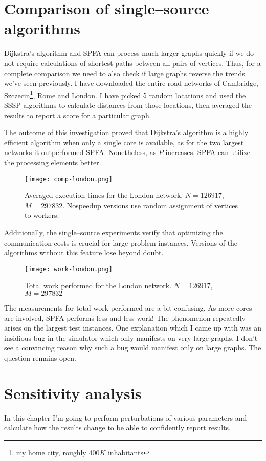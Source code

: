 \documentclass[12pt,a4paper,twoside,openright]{report}
\begin{document}
\section{Comparison of single--source algorithms}
Dijkstra's algorithm and SPFA can process much larger graphs quickly if we do not require calculations of shortest paths between all pairs of vertices. Thus, for a complete comparison we need to also check if large graphs reverse the trends we've seen previously. I have downloaded the entire road networks of Cambridge, Szczecin\footnote{my home city, roughly $400K$ inhabitants}, Rome and London. I have picked $5$ random locations and used the SSSP algorithms to calculate distances from those locations, then averaged the results to report a score for a particular graph.

The outcome of this investigation proved that Dijkstra's algorithm is a highly efficient algorithm when only a single core is available, as for the two largest networks it outperformed SPFA. Nonetheless, as $P$ increases, SPFA can utilize the processing elements better.

\begin{figure}[ht]
\centering
\caption{Averaged execution times for the London network. $N=126917$, $M=297832$. Nospeedup versions use random assignment of vertices to workers.}
\texttt{[image: comp-london.png]}
\end{figure}

Additionally, the single--source experiments verify that optimizing the communication costs is crucial for large problem instances. Versions of the algorithms without this feature lose beyond doubt.

\begin{figure}[ht]
\centering
\caption{Total work performed for the London network. $N=126917$, $M=297832$}
\texttt{[image: work-london.png]}
\end{figure}

The measurements for total work performed are a bit confusing. As more cores are involved, SPFA performs less and less work! The phenomenon repeatedly arises on the largest test instances. One explanation which I came up with was an insidious bug in the simulator which only manifests on very large graphs. I don't see a convincing reason why such a bug would manifest only on large graphs. The question remains open. 

\section{Sensitivity analysis}
In this chapter I'm going to perform perturbations of various parameters and calculate how the results change to be able to confidently report results.
\end{document}
